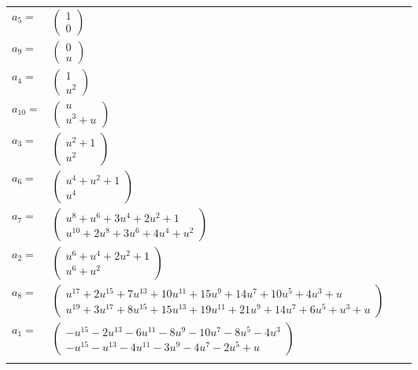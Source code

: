 \documentclass[1p]{elsarticle_modified}
\theoremstyle{definition}
\begin{document}
\begin{tabular}{m{7pt} m{180pt} m{7pt} m{180pt} }
\flushright $a_{5}=$&$\begin{pmatrix}1\\0\end{pmatrix}$ \\
\flushright $a_{9}=$&$\begin{pmatrix}0\\u\end{pmatrix}$ \\
\flushright $a_{4}=$&$\begin{pmatrix}1\\u^2\end{pmatrix}$ \\
\flushright $a_{10}=$&$\begin{pmatrix}u\\u^3+u\end{pmatrix}$ \\
\flushright $a_{3}=$&$\begin{pmatrix}u^2+1\\u^2\end{pmatrix}$ \\
\flushright $a_{6}=$&$\begin{pmatrix}u^4+u^2+1\\u^4\end{pmatrix}$ \\
\flushright $a_{7}=$&$\begin{pmatrix}u^8+u^6+3 u^4+2 u^2+1\\u^{10}+2 u^8+3 u^6+4 u^4+u^2\end{pmatrix}$ \\
\flushright $a_{2}=$&$\begin{pmatrix}u^6+u^4+2 u^2+1\\u^6+u^2\end{pmatrix}$ \\
\flushright $a_{8}=$&$\begin{pmatrix}u^{17}+2 u^{15}+7 u^{13}+10 u^{11}+15 u^9+14 u^7+10 u^5+4 u^3+u\\u^{19}+3 u^{17}+8 u^{15}+15 u^{13}+19 u^{11}+21 u^9+14 u^7+6 u^5+u^3+u\end{pmatrix}$ \\
\flushright $a_{1}=$&$\begin{pmatrix}- u^{15}-2 u^{13}-6 u^{11}-8 u^9-10 u^7-8 u^5-4 u^3\\- u^{15}- u^{13}-4 u^{11}-3 u^9-4 u^7-2 u^5+u\end{pmatrix}$\\&\end{tabular}
\end{document}
